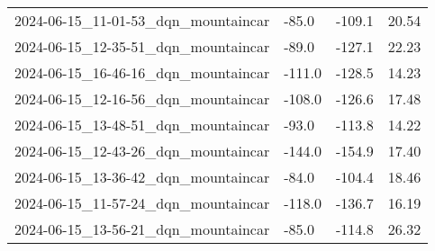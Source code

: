 \documentclass[a4paper,12pt]{article}
\begin{document}
\begin{center}
{\begin{tabular}{llll}
            2024-06-15\_11-01-53\_dqn\_mountaincar & -85.0                 & -109.1                  & 20.54                  \\
            2024-06-15\_12-35-51\_dqn\_mountaincar & -89.0                 & -127.1                  & 22.23                  \\
            2024-06-15\_16-46-16\_dqn\_mountaincar & -111.0                & -128.5                  & 14.23                  \\
            2024-06-15\_12-16-56\_dqn\_mountaincar & -108.0                & -126.6                  & 17.48                  \\
            2024-06-15\_13-48-51\_dqn\_mountaincar & -93.0                 & -113.8                  & 14.22                  \\
            2024-06-15\_12-43-26\_dqn\_mountaincar & -144.0                & -154.9                  & 17.40                  \\
            2024-06-15\_13-36-42\_dqn\_mountaincar & -84.0                 & -104.4                  & 18.46                  \\
            2024-06-15\_11-57-24\_dqn\_mountaincar & -118.0                & -136.7                  & 16.19                  \\
            2024-06-15\_13-56-21\_dqn\_mountaincar & -85.0                 & -114.8                  & 26.32                  \\
        \end{tabular}
    }
\end{center}
\end{document}
